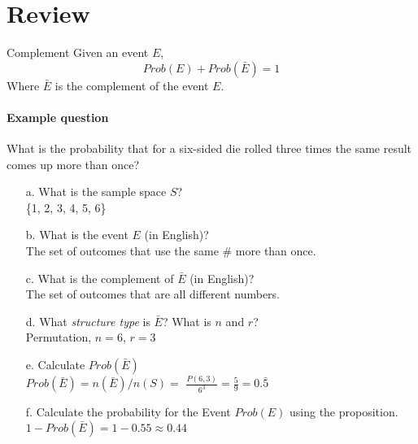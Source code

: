 \documentclass[a4paper,12pt]{book}
\title{}
\author{Rachel Morris}
\date{\today}
\newcounter{question}
\begin{document}
    \togglefalse{answerkey}
    
    \section{Review}

        \begin{intro}{Complement}
            Given an event $E$,
            $$ Prob(E) + Prob(\bar{E}) = 1 $$
            Where $\bar{E}$ is the complement of the event $E$.
                
            \paragraph{Example question}        
            What is the probability that for a six-sided die rolled
            three times the same result comes up more than once?
            
            \begin{enumerate}
                \item[a.] What is the sample space $S$? \\
                    \{1, 2, 3, 4, 5, 6\}
                
                \item[b.] What is the event $E$ (in English)? \\
                    The set of outcomes that use the same \# more than once.
                    
                \item[c.] What is the complement of $\bar{E}$ (in English)? \\
                    The set of outcomes that are all different numbers. 
                
                \item[d.] What \textit{structure type} is $\bar{E}$? What is $n$ and $r$? \\
                    Permutation, $n = 6$, $r = 3$
                
                \item[e.] Calculate $Prob(\bar{E})$ \\
                    $Prob(\bar{E}) = n(\bar{E}) / n(S) =$
                    $\frac{P(6,3)}{6^{3}} = \frac{5}{9} = 0.\bar{5}$
                
                \item[f.] Calculate the probability for the Event $Prob(E)$ using the proposition. \\
                    $1 - Prob(\bar{E}) = 1 - 0.55 \approx 0.44$
            \end{enumerate}

        \end{intro}
\end{document}
